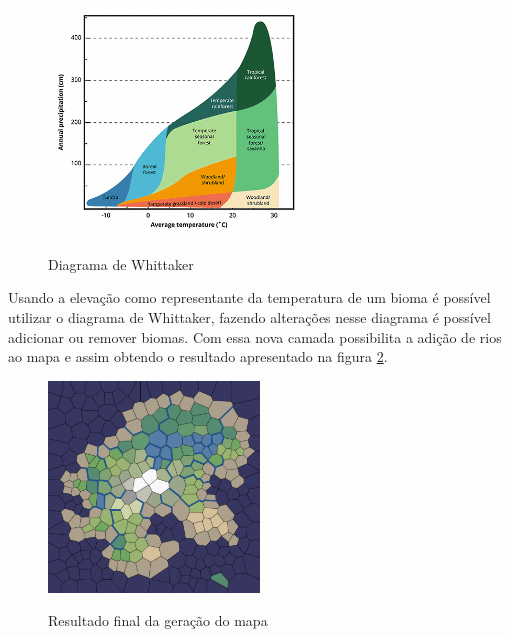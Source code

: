 \begin{figure}[H]
	\caption{Diagrama de Whittaker}
	\centering
	\includegraphics[width=0.6\textwidth]{figures/diagrama-whittaker.png}
	\label{fig:diagrama-whittaker}
\end{figure}

Usando a elevação como representante da temperatura de um bioma é possível utilizar o diagrama de Whittaker, fazendo alterações nesse diagrama é possível adicionar ou remover biomas. Com essa nova camada possibilita a adição de rios ao mapa \cite{amitp2010} e assim obtendo o resultado apresentado na figura \ref{fig:biomes}.

\begin{figure}[H]
	\caption{Resultado final da geração do mapa}
	\centering
	\includegraphics[width=0.5\textwidth]{figures/biomes.png}
	\label{fig:biomes}
\end{figure}


